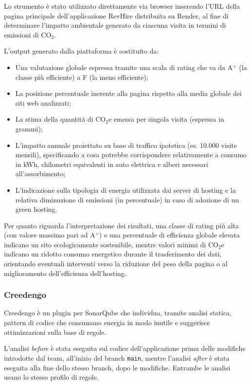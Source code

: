 \documentclass[12pt,a4paper]{article}
\begin{document}
    Lo strumento è stato utilizzato direttamente via browser inserendo l'URL della pagina principale dell'applicazione
    RevHire distribuita su Render, al fine di determinare l'impatto ambientale generato da ciascuna visita in termini
    di emissioni di CO$_2$.

    L'output generato dalla piattaforma è costituito da:
    \begin{itemize}
        \item Una valutazione globale espressa tramite una scala di rating che va da A$^+$ (la classe più efficiente) a F (la meno efficiente);
        \item La posizione percentuale inerente alla pagina rispetto alla media globale dei siti web analizzati;
        \item La stima della quantità di CO$_2$e emessa per singola visita (espressa in grammi);
        \item L'impatto annuale proiettato su base di traffico ipotetica (es. 10.000 visite mensili), specificando a cosa potrebbe corrispondere relativamente a consumo in kWh, chilometri equivalenti in auto elettrica e alberi necessari all'assorbimento;
        \item L'indicazione sulla tipologia di energia utilizzata dai server di hosting e la relativa diminuzione di emissioni (in percentuale) in caso di adozione di un green hosting.
    \end{itemize}

    Per quanto riguarda l'interpretazione dei risultati, una classe di rating più alta
    (con valore massimo pari ad A$^+$)
    e una percentuale di efficienza globale elevata indicano un sito ecologicamente sostenibile, mentre valori minimi
    di CO$_2$e indicano un ridotto consumo energetico durante il trasferimento dei dati, orientando eventuali
    interventi verso la riduzione del peso della pagina o al miglioramento dell'efficienza dell'hosting.
    
    \subsubsection{Creedengo}
    Creedengo è un plugin per SonarQube che individua, tramite analisi statica,
    pattern di codice che consumano energia in modo inutile e suggerisce
    ottimizzazioni sulla base di regole.

    L'analisi \emph{before} è stata eseguita sul codice dell'applicazione prima
    delle modifiche introdotte dal team, all'inizio del branch \texttt{main}, mentre
    l'analisi \emph{after} è stata eseguita alla fine dello stesso branch, dopo le
    modifiche. Entrambe le analisi usano lo stesso profilo di regole.
\end{document}
